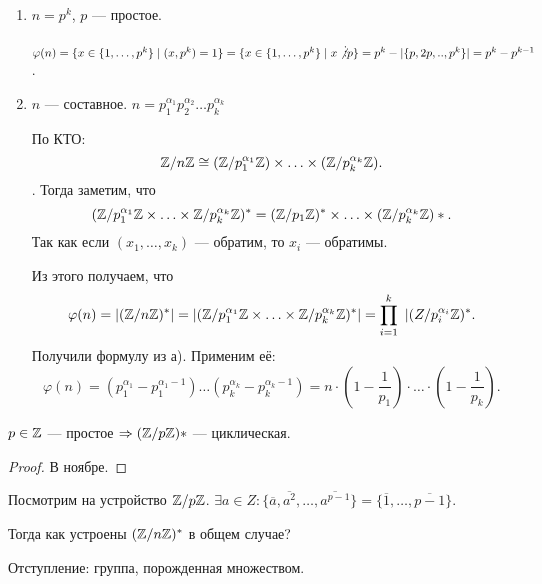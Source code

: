  \begin{enumerate}
     \item $n = p^k$, $p$ --- простое.

         $\varphi(n) = \{x \in \{1,\ldots,p^k\} \mid (x, p^k)=1\} = \{x \in \{1,\ldots, p^k\} \mid x \not \vdots p\} = p^k - |\{p, 2p,..,p^k\}| = p^k - p^{k-1}$.
     \item $n$ --- составное. $n = p_1^{\alpha_1}p_2^{\alpha_2}\ldots p_k^{\alpha_k}$

         По КТО:  \[\mathbb{Z} / n\mathbb{Z} \cong (\mathbb{Z} / p_1^{\alpha_1} \mathbb{Z}) \times \ldots \times (\mathbb{Z} / p_k^{\alpha_k} \mathbb{Z}).\].
         Тогда заметим, что \[
             (\mathbb{Z} / p_1^{\alpha_1} \mathbb{Z} \times \ldots \times \mathbb{Z} / p_k^{\alpha_k} \mathbb{Z})^* = (\mathbb{Z} / p_1 \mathbb{Z})^* \times \ldots \times (\mathbb{Z} / p_k^{\alpha_k} \mathbb{Z})*
         .\] Так как если $(x_1,\ldots,x_k)$ --- обратим, то $x_i$ --- обратимы.

         Из этого получаем, что  \[\varphi(n) = |(\mathbb{Z} / n\mathbb{Z})^*| = |(\mathbb{Z} / p_1^{\alpha_1} \mathbb{Z} \times \ldots \times \mathbb{Z} / p_k^{\alpha_k} \mathbb{Z})^*| = \prod_{i=1}^k\ |(Z / p_i^{\alpha_i} \mathbb{Z})^*.\]
         Получили формулу из а). Применим её: \[
             \varphi(n) = (p_1^{\alpha_1} - p_1^{\alpha_1 - 1})\ldots(p_k^{\alpha_k} - p_k^{\alpha_k - 1}) = n \cdot (1 - \frac{1}{p_1})\cdot\ldots\cdot(1-\frac{1}{p_k})
         .\] 
 \end{enumerate}
 \begin{theorem}
     $p \in \mathbb{Z}$ --- простое  $\Rightarrow (\mathbb{Z} / p\mathbb{Z})*$ --- циклическая.
 \end{theorem}
 \begin{proof}
     В ноябре.
 \end{proof}
 \slashn
 Посмотрим на устройство $\mathbb{Z} / p\mathbb{Z}$.  $\exists a \in Z: \{\overline{a}, \overline{a^2},\ldots,\overline{a^{p-1}}\} = \{\overline{1}, \ldots, \overline{p-1}\}$.

 Тогда как устроены $(\mathbb{Z} / n \mathbb{Z})^*$ в общем случае?

 Отступление: группа, порожденная множеством.

